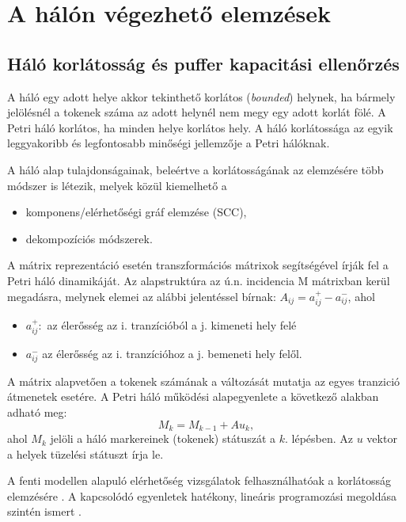 \chapter{A hálón végezhető elemzések}
\section{Háló korlátosság és puffer kapacitási ellenőrzés}

A háló egy adott helye akkor tekinthető korlátos (\textit{bounded}) helynek, ha bármely jelölésnél a tokenek száma az adott helynél nem megy egy adott korlát fölé. A Petri háló korlátos, ha minden helye korlátos hely.
A háló korlátossága az egyik leggyakoribb és legfontosabb minőségi jellemzője a Petri hálóknak. 

A háló alap tulajdonságainak, beleértve a korlátosságának az elemzésére több módszer is létezik, melyek közül kiemelhető a
\begin{itemize}
\item komponens/elérhetőségi gráf elemzése (SCC),
\item dekompozíciós módszerek.
\end{itemize}

A mátrix reprezentáció esetén transzformációs mátrixok segítségével írják fel a Petri háló dinamikáját. Az alapstruktúra az ú.n. incidencia M mátrixban kerül megadásra, melynek elemei az alábbi jelentéssel bírnak: $A_{ij}=a^+_{ij}-a^-_{ij}$, ahol 
\begin{itemize}
\item $a^+_{ij}: $ az élerősség az i. tranzícióból a j. kimeneti hely felé
\item $a^-_{ij}$ az élerősség az i. tranzícióhoz a j. bemeneti hely felől.
\end{itemize}

A mátrix alapvetően a tokenek számának a változását mutatja az egyes tranzició átmenetek esetére. A  Petri háló működési alapegyenlete a következő alakban adható meg: 
$$M_k=M_{k-1}+ Au_k,$$
ahol $M_k$ jelöli a háló markereinek (tokenek) státuszát a $k.$ lépésben. Az $u$ vektor a helyek tüzelési státuszt írja le. 

A fenti modellen alapuló elérhetőség vizsgálatok felhasználhatóak a korlátosság elemzésére \cite{murata1989petri}.
A kapcsolódó  egyenletek hatékony, lineáris programozási megoldása szintén ismert \cite{lasserre1989using}.


